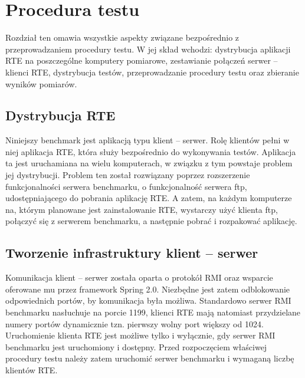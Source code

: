 \chapter{Procedura testu}
Rozdział ten omawia wszystkie aspekty związane bezpośrednio z przeprowadzaniem procedury testu.
W jej skład wchodzi: dystrybucja aplikacji RTE na poszczególne komputery pomiarowe,
zestawianie połączeń serwer -- klienci RTE, dystrybucja testów, przeprowadzanie procedury testu
oraz zbieranie wyników pomiarów.

\section{Dystrybucja RTE}
Niniejszy benchmark jest aplikacją typu klient -- serwer. Rolę klientów pełni w niej aplikacja
RTE, która służy bezpośrednio do wykonywania testów. Aplikacja ta jest uruchamiana na wielu komputerach,
w związku z tym powstaje problem jej dystrybucji. Problem ten został rozwiązany poprzez rozszerzenie
funkcjonalności serwera benchmarku, o funkcjonalność serwera ftp, udostępniającego do pobrania aplikację RTE. 
A zatem, na każdym komputerze na, którym planowane jest zainstalowanie RTE, wystarczy użyć 
klienta ftp, połączyć się z serwerem benchmarku, a następnie pobrać i rozpakować aplikację.

\section{Tworzenie infrastruktury klient -- serwer}\label{sect:infra}
Komunikacja klient -- serwer została oparta o protokół RMI oraz wsparcie oferowane
mu przez framework Spring 2.0. Niezbędne jest zatem odblokowanie odpowiednich portów,
by komunikacja była możliwa. Standardowo serwer RMI benchmarku nasłuchuje na porcie 1199,
klienci RTE mają natomiast przydzielane numery portów dynamicznie tzn. pierwszy wolny port
większy od 1024. Uruchomienie klienta RTE jest możliwe tylko i wyłącznie, gdy serwer RMI benchmarku
jest uruchomiony i dostępny. Przed rozpoczęciem właściwej procedury testu należy zatem uruchomić
serwer benchmarku i wymaganą liczbę klientów RTE. 

